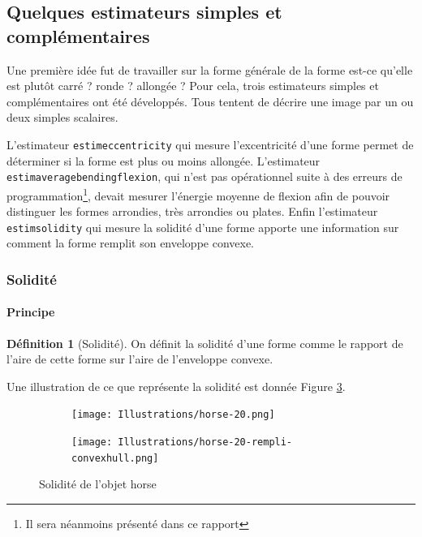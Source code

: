 \documentclass{article}
\theoremstyle{definition}
\newtheorem{definition}{Définition}
\begin{document}
    \subsection{Quelques estimateurs simples et complémentaires}

      Une première idée fut de travailler sur la forme générale de la forme \textendash est-ce qu'elle est plutôt carré ? ronde ? allongée ? Pour cela, trois estimateurs simples et complémentaires ont été développés. Tous tentent de décrire une image par un ou deux simples scalaires.
      
      L'estimateur \texttt{estimeccentricity} qui mesure l'excentricité d'une forme permet de déterminer si la forme est plus ou moins allongée. L'estimateur \texttt{estimaveragebendingflexion}, qui n'est pas opérationnel suite à des erreurs de programmation\footnote{Il sera néanmoins présenté dans ce rapport}, devait mesurer l'énergie moyenne de flexion afin de pouvoir distinguer les formes arrondies, très arrondies ou plates. Enfin l'estimateur \texttt{estimsolidity} qui mesure la solidité d'une forme apporte une information sur comment la forme remplit son enveloppe convexe. %
    
      \subsubsection{Solidité}
      
	\paragraph{Principe}
	
	  \begin{definition}[Solidité]
	    On définit la solidité d'une forme comme le rapport de l'aire de cette forme sur l'aire de l'enveloppe convexe.
	  \end{definition}

	   Une illustration de ce que représente la solidité est donnée Figure \ref{solidité}.
	
	  \begin{figure}[!h]
	    \centering
	    \begin{subfigure}{.25\textwidth}
	      \centering
	      \texttt{[image: Illustrations/horse-20.png]}
	      \label{horse}
	    \end{subfigure}
	    \begin{subfigure}{.25\textwidth}
	      \centering
	      \texttt{[image: Illustrations/horse-20-rempli-convexhull.png]}
	    \label{horse-rempli-convexhull}
	    \end{subfigure}
	    \caption{Solidité de l'objet horse}
	    \label{solidité}
	  \end{figure}
\end{document}
